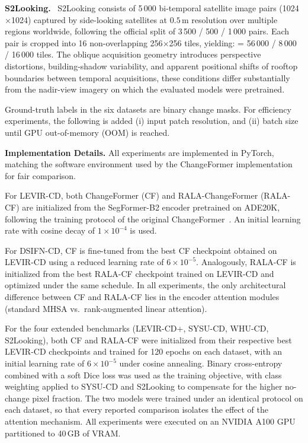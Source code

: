 \documentclass[runningheads]{llncs}
\newcommand{\journal}[1]{{\color{orange}#1}}
\begin{document}
\journal{\noindent \textbf{S2Looking.}~\cite{ShenS2Looking2021}
S2Looking consists of 5\,000 bi-temporal satellite image pairs
(1024$\times$1024) captured by side-looking satellites at $0.5\,\mathrm{m}$
resolution over multiple regions worldwide, following the official split of
3\,500 / 500 / 1\,000 pairs. Each pair is cropped into 16 non-overlapping
256$\times$256 tiles, yielding: \text{Train/Val/Test} = 56\,000 / 8\,000 /
16\,000 tiles. The oblique acquisition geometry introduces perspective
distortions, building-shadow variability, and apparent positional shifts of
rooftop boundaries between temporal acquisitions, these conditions differ
substantially from the nadir-view imagery on which the evaluated models were
pretrained.

Ground-truth labels in the six datasets are binary change masks. For efficiency experiments, the following is added (i) input patch resolution, and (ii) batch size until GPU out-of-memory (OOM) is reached.
}

\noindent \textbf{Implementation Details.} All experiments are implemented in
PyTorch, matching the software environment used by the ChangeFormer
implementation \cite{Bandara2022ChangeFormer} for fair comparison.

For LEVIR-CD, both ChangeFormer (CF) and RALA-ChangeFormer (RALA-CF)
are initialized from the SegFormer-B2 encoder pretrained on ADE20K, following
the training protocol of the original ChangeFormer~\cite{Bandara2022ChangeFormer}.
An initial learning rate with cosine decay of $1\times10^{-4}$ is used.

For DSIFN-CD, CF is fine-tuned from the best CF checkpoint obtained on
LEVIR-CD using a reduced learning rate of $6\times10^{-5}$. Analogously,
RALA-CF is initialized from the best RALA-CF checkpoint trained on LEVIR-CD and
optimized under the same schedule. In all experiments, the only architectural
difference between CF and RALA-CF lies in the encoder attention modules
(standard MHSA vs.\ rank-augmented linear attention).

\journal{For the four extended benchmarks (LEVIR-CD+, SYSU-CD, WHU-CD,
S2Looking), both CF and RALA-CF were initialized from their respective best
LEVIR-CD checkpoints and trained for 120 epochs on each dataset, with an
initial learning rate of $6\times10^{-5}$ under cosine annealing. Binary
cross-entropy combined with a soft Dice loss was used
as the training objective, with class weighting applied to SYSU-CD and
S2Looking to compensate for the higher no-change pixel fraction. The two models
were trained under an identical protocol on each dataset, so that every
reported comparison isolates the effect of the attention mechanism. All
experiments were executed on an NVIDIA A100 GPU partitioned to 40\,GB of
VRAM.}
\end{document}
